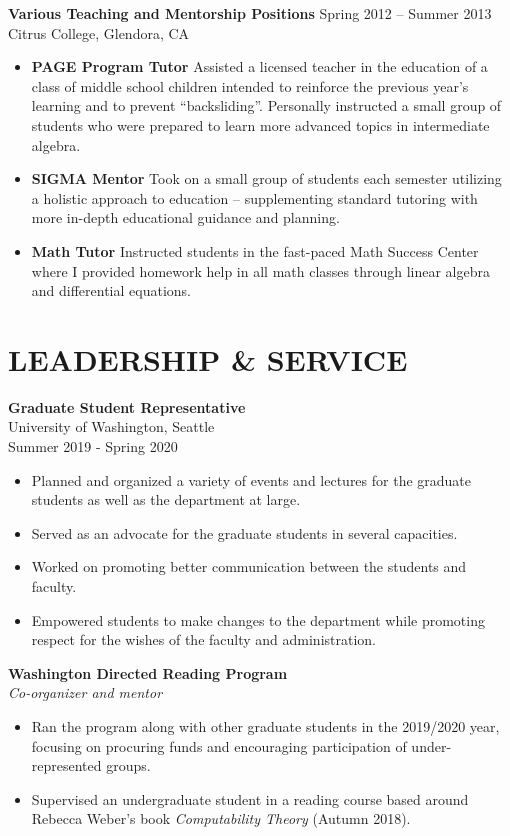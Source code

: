 \documentclass[margin]{res} %
\begin{document}
\begin{resume}
{\bf Various Teaching and Mentorship Positions} \hfill Spring 2012 -- Summer 2013 \\
Citrus College, Glendora, CA
\begin{itemize} \itemsep -1pt
\item {\bf PAGE Program Tutor} Assisted a licensed teacher in the education of a class of middle school children intended to reinforce the previous year’s learning and to prevent “backsliding”. Personally instructed a small group of students who were prepared to learn more advanced topics in intermediate algebra.
\item {\bf SIGMA Mentor} Took on a small group of students each semester utilizing a holistic approach to education – supplementing standard tutoring with more in-depth educational guidance and planning.
\item {\bf Math Tutor} Instructed students in the fast-paced Math Success Center where I provided homework help in all math classes through linear algebra and differential equations.
\end{itemize} 

\section{LEADERSHIP \& SERVICE}

{\bf Graduate Student Representative}\\
University of Washington, Seattle\\
Summer 2019 - Spring 2020
\begin{itemize} \itemsep -1pt
	\item Planned and organized a variety of events and lectures for the graduate students as well as the department at large.
    \item Served as an advocate for the graduate students in several capacities. 
	\item Worked on promoting better communication between the students and faculty.
	\item Empowered students to make changes to the department while promoting respect for the wishes of the faculty and administration.
\end{itemize}

{\bf Washington Directed Reading Program}\\
{\sl Co-organizer and mentor}
\begin{itemize}\itemsep -1pt
	\item Ran the program along with other graduate students in the 2019/2020 year, focusing on procuring funds and encouraging participation of under-represented groups.
	\item Supervised an undergraduate student in a reading course based around Rebecca Weber's book {\sl Computability Theory} (Autumn 2018).
\end{itemize}


\end{resume}
\end{document}
